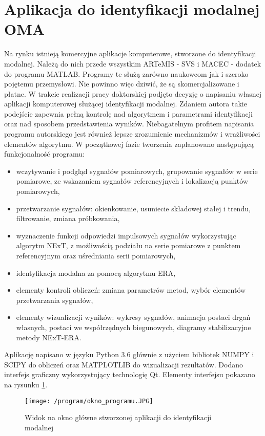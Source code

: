 \section{Aplikacja do identyfikacji modalnej OMA}
Na rynku istnieją komercyjne aplikacje komputerowe, stworzone do identyfikacji modalnej. Należą do nich przede wszystkim ARTeMIS - SVS i MACEC - dodatek do programu MATLAB. Programy te służą zarówno naukowcom jak i szeroko pojętemu przemysłowi. Nie powinno więc dziwić, że są skomercjalizowane i płatne. W trakcie realizacji pracy doktorskiej podjęto decyzję o napisaniu własnej aplikacji komputerowej służącej identyfikacji modalnej. Zdaniem autora takie podejście zapewnia pełną kontrolę nad algorytmem i parametrami identyfikacji oraz nad sposobem przedstawienia wyników. Niebagatelnym profitem napisania programu autorskiego jest również lepsze zrozumienie mechanizmów i wrażliwości elementów algorytmu.
W początkowej fazie tworzenia zaplanowano następującą funkcjonalność programu:
\begin{itemize}
	\item wczytywanie i podgląd sygnałów pomiarowych, grupowanie sygnałów w serie pomiarowe, ze wskazaniem sygnałów referencyjnych i lokalizacją punktów pomiarowych,
	\item przetwarzanie sygnałów: okienkowanie, usuniecie składowej stałej i trendu, filtrowanie, zmiana próbkowania,
	\item wyznaczenie funkcji odpowiedzi impulsowych sygnałów wykorzystując algorytm NExT, z możliwością podziału na serie pomiarowe z punktem referencyjnym oraz uśredniania serii pomiarowych,
	\item identyfikacja modalna za pomocą algorytmu ERA,
	\item elementy kontroli obliczeń: zmiana parametrów metod, wybór elementów przetwarzania sygnałów,
	\item elementy wizualizacji wyników: wykresy sygnałów, animacja postaci drgań własnych, postaci we współrzędnych biegunowych, diagramy stabilizacyjne metody NExT-ERA.
\end{itemize}
Aplikację napisano w języku Python 3.6 głównie z użyciem bibliotek NUMPY i SCIPY do obliczeń oraz MATPLOTLIB do wizualizacji rezultatów. Dodano interfejs graficzny wykorzystujący technologię Qt. Elementy interfejsu pokazano na rysunku \ref{fig: okno_programu_widok}.

\begin{figure}[h]
	\centering
	\texttt{[image: /program/okno\_programu.JPG]}
	\captionsetup{justification=centering}
	\caption{Widok na okno główne stworzonej aplikacji do identyfikacji modalnej}
	\label{fig: okno_programu_widok}
\end{figure}


